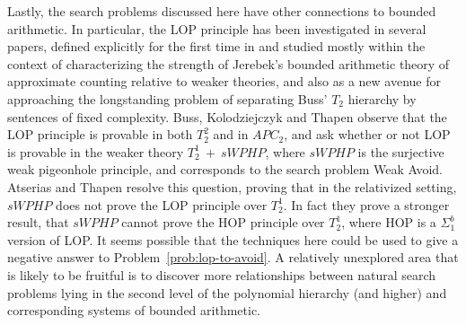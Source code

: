Lastly, the search problems discussed here have other connections to bounded arithmetic.
In particular, the LOP principle has been investigated in several papers, defined explicitly for the first time in \cite{Chiari1998-CHIWFI} and studied mostly within the context of characterizing the  strength of Jerebek's bounded arithmetic theory of approximate counting relative to weaker theories, and also as a new avenue for approaching the longstanding problem of separating Buss' $T_2$ hierarchy by sentences of fixed complexity. 
Buss, Kolodziejczyk and Thapen \cite{BussKT14} observe that the LOP principle is provable in both
$T^2_2$ and in $APC_2$, and ask whether or not  
LOP is provable in the weaker theory $T^1_2 ~ + ~ sWPHP$, 
where $sWPHP$ is the surjective weak pigeonhole principle, and corresponds to the search problem Weak Avoid.
Atserias and Thapen \cite{AtseriasT13} resolve this question,
proving that in the relativized setting,
$sWPHP$ does not prove the LOP principle over $T^1_2$.
In fact they prove a stronger result, that 
$sWPHP$ cannot prove the HOP principle over $T^1_2$,
where HOP is a
$\Sigma_1^b$ version of LOP. 
It seems possible that the techniques here could be used to give a negative answer to Problem~\ref{prob:lop-to-avoid}.
A relatively unexplored area that is likely to be fruitful is to discover more relationships between natural search problems lying in the second level of the polynomial hierarchy (and higher) and corresponding systems of bounded arithmetic. 







